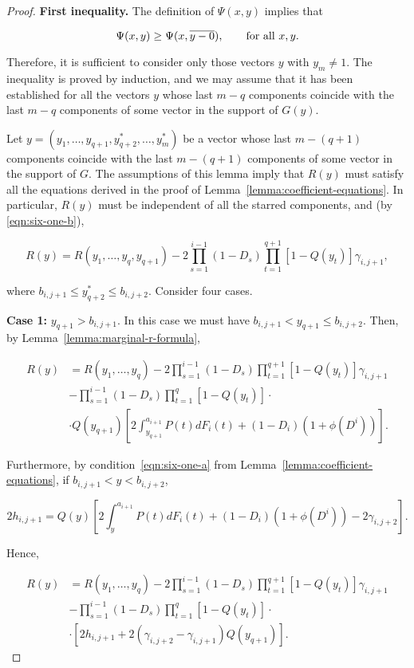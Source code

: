 \documentclass{article}
\begin{document}
\begin{proof}

\textbf{First inequality.} The definition of $\Psi(x, y)$ implies that

\[
\Psi(x, y) \geq \Psi(x, \overline{y-0}), \qquad \textup{for all } x, y.
\]

Therefore, it is sufficient to consider only those vectors $y$ with $y_m \neq
1$. The inequality is proved by induction, and we may assume that it has been
established for all the vectors $y$ whose last $m-q$ components coincide with
the last $m-q$ components of some vector in the support of $G(y)$.

Let $y = (y_1, \dots, y_{q+1}, y^*_{q+2}, \dots, y^*_m)$ be a vector whose last
$m - (q+1)$ components coincide with the last $m - (q+1)$ components of some
vector in the support of $G$. The assumptions of this lemma imply that $R(y)$
must satisfy all the equations derived in the proof of
Lemma~\ref{lemma:coefficient-equations}. In particular, $R(y)$ must be
independent of all the starred components, and (by \ref{eqn:six-one-b}),

\[
R(y) = R(y_1, \dots, y_q, y_{q+1})
 - 2 \prod_{s=1}^{i-1}(1-D_s)
\prod_{t=1}^{q+1} [1 - Q(y_t)] \gamma_{i, j+1},
\]

where $b_{i, j+1} \leq y^*_{q+2} \leq b_{i, j+2}$. Consider four cases.

\textbf{Case 1:} $y_{q+1} > b_{i, j+1}$. In this case we must have $b_{i, j+1}
< y_{q+1} \leq b_{i, j+2}$. Then, by Lemma~\ref{lemma:marginal-r-formula},

\begin{align*}
R(y)
&= R(y_1, \dots, y_q) - 2 \prod_{s=1}^{i-1}(1-D_s)
\prod_{t=1}^{q+1} [1 - Q(y_t)] \gamma_{i, j+1} \\
&- \prod_{s=1}^{i-1}(1-D_s) \prod_{t=1}^{q} [1 - Q(y_t)] \cdot  \\
& \cdot Q(y_{q+1}) \left [
    2 \int_{y_{q+1}}^{a_{i+1}} P(t) dF_i(t) + (1-D_i)(1+\phi(D^i))
\right ].
\end{align*}

Furthermore, by condition~\ref{eqn:six-one-a} from
Lemma~\ref{lemma:coefficient-equations}, if $b_{i, j+1} < y < b_{i, j+2}$,

\[
2h_{i, j+1} = Q(y) \left [
  2 \int_{y}^{a_{i+1}} P(t) dF_i(t) + (1-D_i)(1+\phi(D^i)) - 2 \gamma_{i, j+2}
\right ].
\]

Hence,

\begin{align*}
R(y)
&= R(y_1, \dots, y_q) - 2 \prod_{s=1}^{i-1}(1-D_s)
\prod_{t=1}^{q+1} [1 - Q(y_t)] \gamma_{i, j+1} \\
&- \prod_{s=1}^{i-1}(1-D_s) \prod_{t=1}^{q} [1 - Q(y_t)] \cdot  \\
& \cdot \left [
2h_{i, j+1} + 2(\gamma_{i, j+2} - \gamma_{i, j+1})Q(y_{q+1})
\right ].
\end{align*}


\end{proof}
\end{document}
